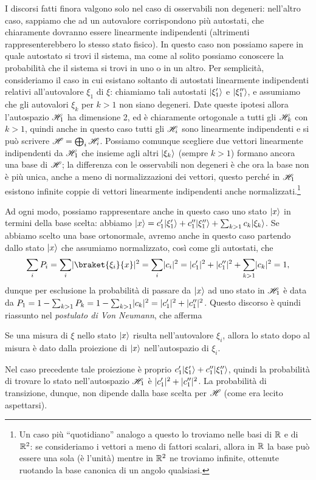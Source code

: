I discorsi fatti finora valgono solo nel caso di osservabili non degeneri: nell'altro caso, sappiamo che ad un autovalore corrispondono più autostati, che chiaramente dovranno essere linearmente indipendenti (altrimenti rappresenterebbero lo stesso stato fisico).
In questo caso non possiamo sapere in quale autostato si trovi il sistema, ma come al solito possiamo conoscere la probabilità che il sistema si trovi in uno o in un altro.
Per semplicità, consideriamo il caso in cui esistano soltanto di autostati linearmente indipendenti relativi all'autovalore $\xi_1$ di $\xi$: chiamiamo tali autostati $\lvert\xi_1'\rangle$ e $\lvert\xi_1''\rangle$, e assumiamo che gli autovalori $\xi_k$ per $k>1$ non siano degeneri.
Date queste ipotesi allora l'autospazio $\mathscr H_1$ ha dimensione 2, ed è chiaramente ortogonale a tutti gli $\mathscr H_k$ con $k>1$, quindi anche in questo caso tutti gli $\mathscr H_i$ sono linearmente indipendenti e si può scrivere $\mathscr H=\bigoplus_i\mathscr H_i$.
Possiamo comunque scegliere due vettori linearmente indipendenti da $\mathscr H_1$ che insieme agli altri $\lvert\xi_k\rangle$ (sempre $k>1$) formano ancora una base di $\mathscr H$; la differenza con le osservabili non degeneri è che ora la base non è più unica, anche a meno di normalizzazioni dei vettori, questo perch\'e in $\mathscr H_1$ esistono infinite coppie di vettori linearmente indipendenti anche normalizzati.\footnote{Un caso più ``quotidiano'' analogo a questo lo troviamo nelle basi di $\mathbb{R}$ e di $\mathbb{R}^2$: se consideriamo i vettori a meno di fattori scalari, allora in $\mathbb{R}$ la base può essere una sola (è l'unità) mentre in $\mathbb{R}^2$ ne troviamo infinite, ottenute ruotando la base canonica di un angolo qualsiasi.}

Ad ogni modo, possiamo rappresentare anche in questo caso uno stato $\lvert x\rangle$ in termini della base scelta: abbiamo $\lvert x\rangle=c_1'\lvert\xi_1'\rangle+c_1''\lvert\xi_1''\rangle+\sum_{k>1}c_k\lvert\xi_k\rangle$.
Se abbiamo scelto una base ortonormale, avremo anche in questo caso partendo dallo stato $\lvert x\rangle$ che assumiamo normalizzato, cos\`i come gli autostati, che
\begin{equation}
	\sum_iP_i=\sum_i\abs{\braket{\xi_i}{x}}^2=\sum_i\abs{c_i}^2=\abs{c_1'}^2+\abs{c_1''}^2+\sum_{k>1}\abs{c_k}^2=1,
\end{equation}
dunque per esclusione la probabilità di passare da $\lvert x\rangle$ ad uno stato in $\mathscr H_1$ è data da $P_1=1-\sum_{k>1}P_k=1-\sum_{k>1}\lvert c_k\rvert^2=\lvert c_1'\rvert^2+\lvert c_1''\rvert^2$.
Questo discorso è quindi riassunto nel \emph{postulato di Von Neumann}, che afferma
\begin{postulato}
	Se una misura di $\xi$ nello stato $\lvert x\rangle$ risulta nell'autovalore $\xi_i$, allora lo stato dopo al misura è dato dalla proiezione di $\lvert x\rangle$ nell'autospazio di $\xi_i$.
\end{postulato}
Nel caso precedente tale proiezione è proprio $c_1'\lvert\xi_1'\rangle+c_1''\lvert\xi_1''\rangle$, quindi la probabilità di trovare lo stato nell'autospazio $\mathscr H_1$ è $\lvert c_1'\rvert^2+\lvert c_1''\rvert^2$.
La probabilità di transizione, dunque, non dipende dalla base scelta per $\mathscr H$ (come era lecito aspettarsi).

